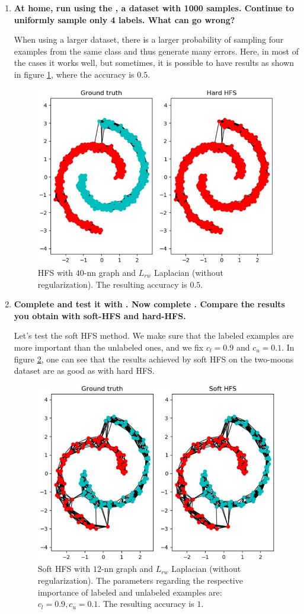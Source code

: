 \documentclass[a4paper, 11pt]{article}
\begin{document}
\begin{enumerate}
	\item \textbf{At home, run  using the , a dataset with 1000 samples. Continue to uniformly sample only 4 labels. What can go wrong?}
	
	When using a larger dataset, there is a larger probability of sampling four examples from the same class and thus generate many errors. Here, in most of the cases it works well, but sometimes, it is possible to have results as shown in figure \ref{fig:q12-hard-hfs-fail}, where the accuracy is $0.5$.
	
	\begin{figure}[!htb]
	    \centering
	    \includegraphics[width=.5\textwidth]{images/q12_hard-hfs-fail.jpg}
	    \caption{HFS with $40$-nn graph and $L_{rw}$ Laplacian (without regularization). The resulting accuracy is $0.5$.}
	    \label{fig:q12-hard-hfs-fail}
	\end{figure}
	
	\item \textbf{Complete  and test it with . Now complete . Compare the results you obtain with soft-HFS and hard-HFS.}
	
	Let's test the soft HFS method. We make sure that the labeled examples are more important than the unlabeled ones, and we fix $c_l = 0.9$ and $c_u = 0.1$. In figure \ref{fig:q13-soft-hfs}, one can see that the results achieved by soft HFS on the two-moons dataset are as good as with hard HFS.
	
	\begin{figure}[!htb]
	    \centering
	    \includegraphics[width=.5\textwidth]{images/q13_soft-hfs.jpg}
	    \caption{Soft HFS with $12$-nn graph and $L_{rw}$ Laplacian (without regularization). The parameters regarding the respective importance of labeled and unlabeled examples are: $c_l = 0.9, c_u = 0.1$. The resulting accuracy is $1$.}
	    \label{fig:q13-soft-hfs}
	\end{figure}
	

\end{enumerate}
\end{document}
